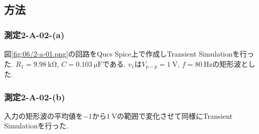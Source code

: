 \subsection{方法}
\subsubsection{測定2-A-02-(a)}
図\ref{fig:06/2-a-01.png}の回路をQucs Spice上で作成しTransient Simulationを行った.
$R_1=9.98\ \si{\kilo\ohm}$, $C=0.103\ \si{\micro\farad}$である.
$v_1$は$V_{p-p}=1\ \si{\volt}$, $f=80\ \si{\hertz}$の矩形波とした.
\subsubsection{測定2-A-02-(b)}
入力の矩形波の平均値を$-1$から$1\ \si{\volt}$の範囲で変化させて同様にTransient Simulationを行った.